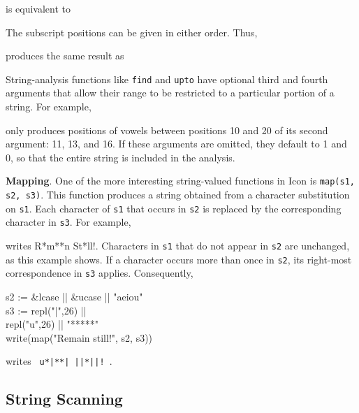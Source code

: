 
\noindent is equivalent to


The subscript positions can be given in either order. Thus,


\noindent produces the same result as


String-analysis functions like \texttt{find} and \texttt{upto} have
optional third and fourth arguments that allow their range to be
restricted to a particular portion of a string. For example,


\noindent only produces positions of vowels between positions 10 and
20 of its second argument: 11, 13, and 16. If these arguments are
omitted, they default to 1 and 0, so that the entire string is
included in the analysis.


\textbf{Mapping}. One of the more interesting string-valued functions
in Icon is \texttt{map(s1, s2, s3)}. This function produces a string
obtained from a character substitution on \texttt{s1}. Each character
of \texttt{s1} that occurs in \texttt{s2} is replaced by the
corresponding character in \texttt{s3}. For example,


\noindent writes R*m**n St*ll!. Characters in \texttt{s1} that do not
appear in \texttt{s2} are unchanged, as this example shows. If a
character occurs more than once in \texttt{s2}, its right-most
correspondence in \texttt{s3} applies. Consequently,

\begin{iconcode}
\>s2 := \&lcase || \&ucase || "aeiou"\\
\>s3 := repl("|",26) ||\\
\>repl("u",26) || "*****"\\
\>write(map("Remain still!", s2, s3))
\end{iconcode}

\noindent
writes \verb+ u*|**| ||*||! +.


\subsection{String Scanning}

